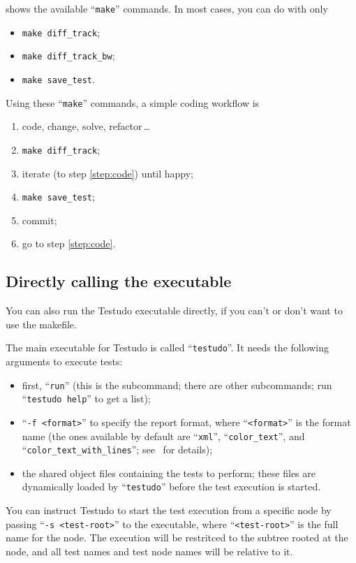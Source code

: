 \documentclass[twoside, a4paper, article]{memoir}
\newcommand*\ellipsis{\,\ldots}
\begin{document}
 shows the available ``\texttt{make}'' commands.  In
most cases, you can do with only
\begin{itemize}
\item \texttt{make diff\_track};
\item \texttt{make diff\_track\_bw};
\item \texttt{make save\_test}.
\end{itemize}

Using these ``\texttt{make}'' commands, a simple coding workflow is
\begin{enumerate}
\item\label{step:code} code, change, solve, refactor\ellipsis{}
\item \texttt{make diff\_track};
\item iterate (to step \ref{step:code}) until happy;
\item \texttt{make save\_test};
\item commit;
\item go to step \ref{step:code}.
\end{enumerate}


\subsection{Directly calling the executable}
\label{sec:directly-calling-executable}

You can also run the Testudo executable directly, if you can't or don't want to
use the makefile.

The main executable for Testudo is called ``\texttt{testudo}''.  It needs the
following arguments to execute tests:
\begin{itemize}
\item first, ``\texttt{run}'' (this is the subcommand; there are other
  subcommands; run ``\texttt{testudo help}'' to get a list);
\item ``\texttt{-f <format>}'' to specify the report format, where
  ``\texttt{<format>}'' is the format name (the ones available by default are
  ``\texttt{xml}'', ``\texttt{color\_text}'', and
  ``\texttt{color\_text\_with\_lines}''; see~ for
  details);
\item the shared object files containing the tests to perform; these files are
  dynamically loaded by ``\texttt{testudo}'' before the test execution is
  started.
\end{itemize}

You can instruct Testudo to start the test execution from a specific node by
passing ``\texttt{-s <test-root>}'' to the executable, where
``\texttt{<test-root>}'' is the full name for the node.  The execution will be
restritced to the subtree rooted at the node, and all test names and test node
names will be relative to it.
\end{document}
